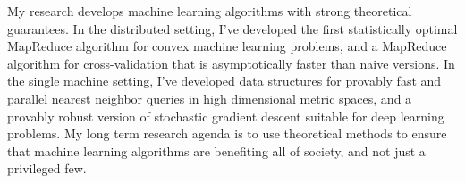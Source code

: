 \documentclass[12pt]{article}
\begin{document}
\noindent
My research develops machine learning algorithms with strong theoretical guarantees.
In the distributed setting, 
I've developed the first statistically optimal MapReduce algorithm for convex machine learning problems,
and a MapReduce algorithm for cross-validation that is asymptotically faster than naive versions.
In the single machine setting,
I've developed data structures for provably fast and parallel nearest neighbor queries in high dimensional metric spaces, 
and a provably robust version of stochastic gradient descent suitable for deep learning problems.
My long term research agenda is to use theoretical methods to ensure that machine learning algorithms are benefiting all of society, and not just a privileged few.

\end{document}

